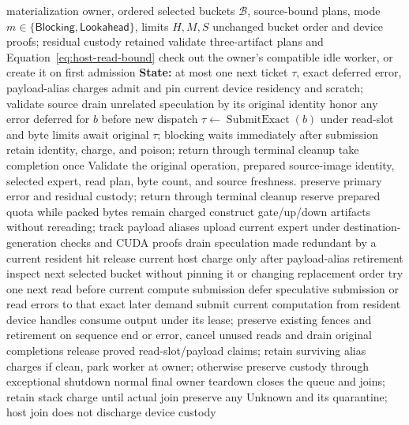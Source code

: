 \begin{algorithm}[!htbp]
\caption{Bounded next-expert reads in a synchronous forward}
\label{alg:bounded-lookahead}
\fontsize{9}{9.6}\selectfont
\begin{algorithmic}[1]
\REQUIRE materialization owner, ordered selected buckets $\mathcal B$, source-bound plans,
         mode $m\in\{\mathsf{Blocking},\mathsf{Lookahead}\}$, limits $H,M,S$
\ENSURE unchanged bucket order and device proofs; residual custody retained
\STATE validate three-artifact plans and Equation~\ref{eq:host-read-bound}
\STATE check out the owner's compatible idle worker, or create it on first admission
\STATE \textbf{State:} at most one next ticket $\tau$, exact deferred error, payload-alias charges
  \STATE admit and pin current device residency and scratch; validate source
    \STATE drain unrelated speculation by its original identity
    \STATE honor any error deferred for $b$ before new dispatch
      \STATE $\tau\gets\operatorname{SubmitExact}(b)$ under read-slot and byte limits
    \ENDIF
    \STATE await original $\tau$; blocking waits immediately after submission
      \STATE retain identity, charge, and poison; return through terminal cleanup
    \ENDIF
    \STATE take completion once
    \STATE Validate the original operation, prepared source-image identity, selected expert,
    \STATE \hspace{1em}read plan, byte count, and source freshness.
      \STATE preserve primary error and residual custody; return through terminal cleanup
    \ENDIF
    \STATE reserve prepared quota while packed bytes remain charged
    \STATE construct gate/up/down artifacts without rereading; track payload aliases
    \STATE upload current expert under destination-generation checks and CUDA proofs
  \ENDIF
  \STATE drain speculation made redundant by a current resident hit
  \STATE release current host charge only after payload-alias retirement
  \STATE inspect next selected bucket without pinning it or changing replacement order
    \STATE try one next read before current compute submission
    \STATE defer speculative submission or read errors to that exact later demand
  \ENDIF
  \STATE submit current computation from resident device handles
  \STATE consume output under its lease; preserve existing fences and retirement
\ENDFOR
\STATE on sequence end or error, cancel unused reads and drain original completions
\STATE release proved read-slot/payload claims; retain surviving alias charges
\STATE if clean, park worker at owner; otherwise preserve custody through exceptional shutdown
\STATE normal final owner teardown closes the queue and joins; retain stack charge until actual join
\STATE preserve any Unknown and its quarantine; host join does not discharge device custody
\end{algorithmic}
\end{algorithm}

